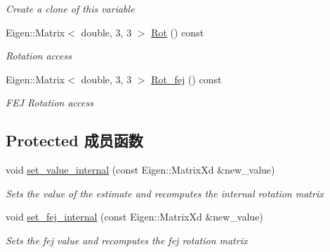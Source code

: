 \begin{DoxyCompactItemize}
\begin{DoxyCompactList}\small\item\em Create a clone of this variable \end{DoxyCompactList}\item 
\mbox{\label{classov__type_1_1JPLQuat_a8066e5417183815c51035932f3027f74}} 
Eigen\+::\+Matrix$<$ double, 3, 3 $>$ \hyperlink{classov__type_1_1JPLQuat_a8066e5417183815c51035932f3027f74}{Rot} () const
\begin{DoxyCompactList}\small\item\em Rotation access \end{DoxyCompactList}\item 
\mbox{\label{classov__type_1_1JPLQuat_a2747deed39c33fe3cd2caeb7096dbc56}} 
Eigen\+::\+Matrix$<$ double, 3, 3 $>$ \hyperlink{classov__type_1_1JPLQuat_a2747deed39c33fe3cd2caeb7096dbc56}{Rot\+\_\+fej} () const
\begin{DoxyCompactList}\small\item\em F\+EJ Rotation access \end{DoxyCompactList}\end{DoxyCompactItemize}
\subsection*{Protected 成员函数}
\begin{DoxyCompactItemize}
\item 
void \hyperlink{classov__type_1_1JPLQuat_a0ea10a064e10b3788ec541cf667c8e99}{set\+\_\+value\+\_\+internal} (const Eigen\+::\+Matrix\+Xd \&new\+\_\+value)
\begin{DoxyCompactList}\small\item\em Sets the value of the estimate and recomputes the internal rotation matrix \end{DoxyCompactList}\item 
void \hyperlink{classov__type_1_1JPLQuat_ac1e67273e4414bc4a162787ff6d73a48}{set\+\_\+fej\+\_\+internal} (const Eigen\+::\+Matrix\+Xd \&new\+\_\+value)
\begin{DoxyCompactList}\small\item\em Sets the fej value and recomputes the fej rotation matrix \end{DoxyCompactList}\end{DoxyCompactItemize}
